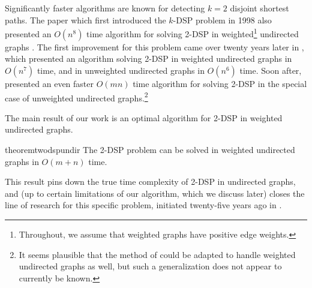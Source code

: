 \documentclass[11pt]{article}
\theoremstyle{definition}
\newcommand\nicole[1]{\textcolor{red}{Nicole says: #1}}
\begin{document}
Significantly faster algorithms are known for detecting $k=2$ disjoint shortest paths.
The paper which first introduced the \textsf{$k$-DSP} problem in 1998 also presented an $O(n^8)$ time algorithm for solving \textsf{2-DSP} in weighted\footnote{Throughout, we assume that weighted graphs have positive edge weights.} undirected graphs \cite{Tzoreff1998}.
The first improvement for this problem came over twenty years later in \cite{Akhmedov2020}, 
which presented an algorithm solving \textsf{2-DSP} in weighted undirected graphs in $O(n^7)$ time, and in unweighted undirected graphs in $O(n^6)$ time.
Soon after, \cite[Theorem 1]{Geometric-Lens-conf} presented an even faster $O(mn)$ time algorithm for solving \textsf{2-DSP} in the special case of unweighted undirected graphs.\footnote{It seems plausible that the method of \cite{Geometric-Lens-conf} could be adapted to handle weighted undirected graphs as well, but such a generalization does not appear to currently be known.}

The main result of our work is an optimal algorithm for \textsf{2-DSP} in weighted undirected graphs.

\begin{restatable}{theorem}{twodspundir}
    \label{2dsp-undir}
    The \textsf{2-DSP} problem can be solved in weighted undirected graphs in $O(m+n)$ time.
\end{restatable}


This result pins down the true time complexity of \textsf{2-DSP} in undirected graphs, and (up to certain limitations of our algorithm, which we discuss later) closes the line of research for this specific problem, initiated twenty-five years ago in \cite{Tzoreff1998}.
\end{document}

